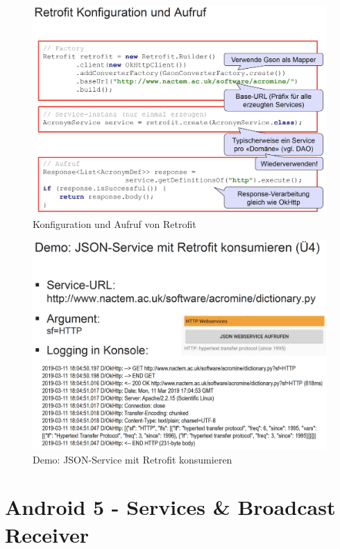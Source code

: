 \documentclass[a4paper]{article}
\begin{document}
	\newpage
	
	\begin{figure}[!htb]
		\centering
		\includegraphics[width=.95\textwidth]{img/retrofit_config.png}
		\caption{Konfiguration und Aufruf von Retrofit}
		\label{fig:retrofit_config}
	\end{figure}

	\begin{figure}[!htb]
		\centering
		\includegraphics[width=.95\textwidth]{img/retrofit_demo.png}
		\caption{Demo: JSON-Service mit Retrofit konsumieren}
		\label{fig:retrofit_demo}
	\end{figure}
		
\newpage
\section{Android 5 - Services \& Broadcast Receiver}
\end{document}
